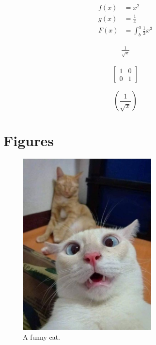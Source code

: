 \documentclass{article}
\begin{document}
    \begin{align*}
        f(x) &= x^2\\
        g(x) &= \frac{1}{x}\\
        F(x) &= \int^a_b \frac{1}{3}x^3
    \end{align*}

    \begin{align*}
        \frac{1}{\sqrt{x}}
    \end{align*}

    \begin{align*}
        \left[
        \begin{matrix}
            1 & 0 \\
            0 & 1
        \end{matrix}
        \right]
    \end{align*}

    \begin{equation*}
        \left(
            \frac{1}{\sqrt{x}}
        \right)
    \end{equation*}

    \newpage
    \section{Figures}
    \begin{figure}[h!]
    \centering
        \includegraphics[width=70mm]{cat.jpg}
        \caption{A funny cat.}
        \label{fig:cat1}
    \end{figure}
\end{document}
